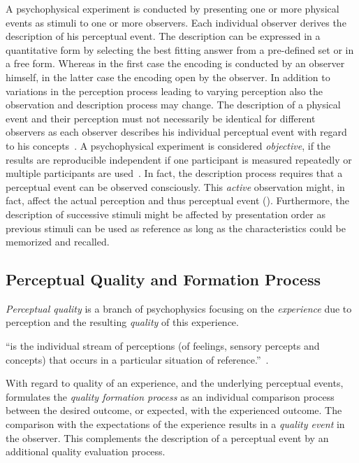 A psychophysical experiment is conducted by presenting one or more physical events as stimuli to one or more observers.
Each individual observer derives the description of his perceptual event.
The description can be expressed in a quantitative form by selecting the best fitting answer from a pre-defined set or in a free form.
Whereas in the first case the encoding is conducted by an observer himself, in the latter case the encoding open by the observer.
In addition to variations in the perception process leading to varying perception also the observation and description process may change.
The description of a physical event and their perception must not necessarily be identical for different observers as each observer describes his individual perceptual event with regard to his concepts~\citep[p. 11]{blauert_spatial_1996}.
A psychophysical experiment is considered \emph{objective}, if the results are reproducible independent if one participant is measured repeatedly or multiple participants are used~\citep[p. 11]{blauert_spatial_1996}.
In fact, the description process requires that a perceptual event can be observed consciously.
This \emph{active} observation might, in fact, affect the actual perception and thus perceptual event (\citet{moller_quality_2014}).
Furthermore, the description of successive stimuli might be affected by presentation order as previous stimuli can be used as reference as long as the characteristics could be memorized and recalled.

\subsection{Perceptual Quality and Formation Process}
\emph{Perceptual quality} is a branch of psychophysics focusing on the \emph{experience} due to perception and the resulting \emph{quality} of this experience.
\begin{definition}[Experiencing]
``is the individual stream of perceptions (of feelings, sensory percepts and concepts) that occurs in a particular situation of reference.''~\citep[p. 13]{moller_quality_2014}.
\end{definition}

With regard to quality of an experience, and the underlying perceptual events, \citet{jekosch_voice_2005} formulates the \emph{quality formation process} as an individual comparison process between the desired outcome, or expected, with the experienced outcome.
The comparison with the expectations of the experience results in a \emph{quality event} in the observer.
This complements the description of a perceptual event by an additional quality evaluation process.

